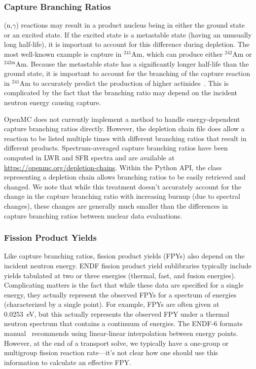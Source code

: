 \documentclass[3p,authoryear]{elsarticle}
\begin{document}
\subsubsection{Capture Branching Ratios}

(n,$\gamma$) reactions may result in a product nucleus being in either the
ground state or an excited state. If the excited state is a metastable state
(having an unusually long half-life), it is important to account for this
difference during depletion. The most well-known example is capture in
$^{241}$Am, which can produce either $^{242}$Am or $^{242\text{m}}$Am. Because the
metastable state has a significantly longer half-life than the ground state, it
is important to account for the branching of the capture reaction in $^{241}$Am
to accurately predict the production of higher actinides~\citep{haeck2012nse}.
This is complicated by the fact that the branching ratio may depend on the
incident neutron energy causing capture.

OpenMC does not currently implement a method to handle energy-dependent capture
branching ratios directly. However, the depletion chain file does allow a
reaction to be listed multiple times with different branching ratios that result
in different products. Spectrum-averaged capture branching ratios have been
computed in LWR and SFR spectra and are available at
\url{https://openmc.org/depletion-chains}. Within the Python API, the class
representing a depletion chain allows branching ratios to be easily retrieved
and changed. We note that while this treatment doesn't accurately account for
the change in the capture branching ratio with increasing burnup (due to
spectral changes), these changes are generally much smaller than the differences
in capture branching ratios between nuclear data evaluations.

\subsubsection{Fission Product Yields}
\label{sec:fpy}

Like capture branching ratios, fission product yields (FPYs) also depend on the
incident neutron energy. ENDF fission product yield sublibraries typically
include yields tabulated at two or three energies (thermal, fast, and fusion
energies). Complicating matters is the fact that while these data are specified
for a single energy, they actually represent the observed FPYs for a spectrum of
energies (characterized by a single point). For example, FPYs are often given at
\SI{0.0253}{\electronvolt}, but this actually represents the observed FPY under
a thermal neutron spectrum that contains a continuum of energies. The ENDF-6
formats manual~\citep{trkov2018bnl} recommends using linear-linear interpolation
between energy points. However, at the end of a transport solve, we typically
have a one-group or multigroup fission reaction rate---it's not clear how one
should use this information to calculate an effective FPY.
\end{document}
